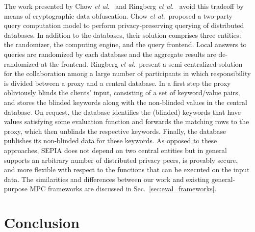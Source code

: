 \documentclass[letterpaper,11pt,onecolumn,titlepage]{article}
\begin{document}
The work presented by Chow \emph{et al.}~\cite{chow2009tpc} and Ringberg 
\emph{et al.}~\cite{ringberg2009cpp} avoid this
tradeoff by means of cryptographic data obfuscation.
Chow \emph{et al.}~proposed a two-party query computation model to perform
privacy-preserving querying of distributed databases. In
addition to the databases, their solution comprises three entities: the
randomizer, the computing engine, and  the query frontend. 
Local answers to queries are randomized by each database and the aggregate
results are de-randomized at the frontend.
Ringberg \emph{et al.}~present a semi-centralized solution for the
collaboration among a large number of participants in which
responsibility is divided between a proxy and a central database. In a first step the proxy obliviously blinds the
clients' input, consisting of a set of keyword/value pairs, and stores the
blinded keywords along with the non-blinded values in the central database.
On request, the database identifies the (blinded) keywords that have values
satisfying some evaluation function and forwards the matching rows to the proxy,
which then unblinds the respective keywords. Finally, the database publishes
its non-blinded data for these keywords.
As opposed to these approaches, SEPIA does not depend on two central
entities but in general supports an arbitrary number of distributed privacy peers,
is provably secure, and more flexible with respect to the functions that can be
executed on the input data. 
The similarities and differences between our work and existing general-purpose 
MPC frameworks are discussed in Sec.~\ref{sec:eval_frameworks}.




\section{Conclusion}\label{sec:conclusion}
\end{document}
